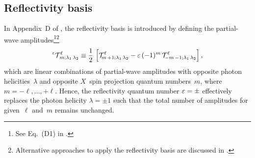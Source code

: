 \subsection{Reflectivity basis}%
\label{sec:photoprod:reflectivity}

In Appendix~D of , the reflectivity basis is
introduced by defining the partial-wave amplitudes\footnote{See
Eq.~(D1) in .}\footnote{Alternative
approaches to apply the reflectivity basis are discussed in
.}
\begin{equation}
  \label{eq:photoprod_amplitude_refl}
  \prescript{\refl}{}{\prodAmp}^\ell_{\!m; \lambda_1\, \lambda_2}
  \equiv \frac{1}{2}\, \sBrk{\prodAmp^\ell_{\!m\, {+1}; \lambda_1\, \lambda_2}
  - \refl\, (-1)^m\, \prodAmp^\ell_{\!{-m}\, {-1}; \lambda_1\, \lambda_2}},
\end{equation}
which are linear combinations of partial-wave amplitudes with opposite
photon helicities~$\lambda$ and opposite $X$~spin projection quantum
numbers~$m$, where $m = -\ell, \ldots, +\ell$.  Hence, the
reflectivity quantum number $\varepsilon = \pm$ effectively replaces the
photon helicity $\lambda = \pm 1$ such that the total number of
amplitudes for given~$\ell$ and~$m$ remains unchanged.

